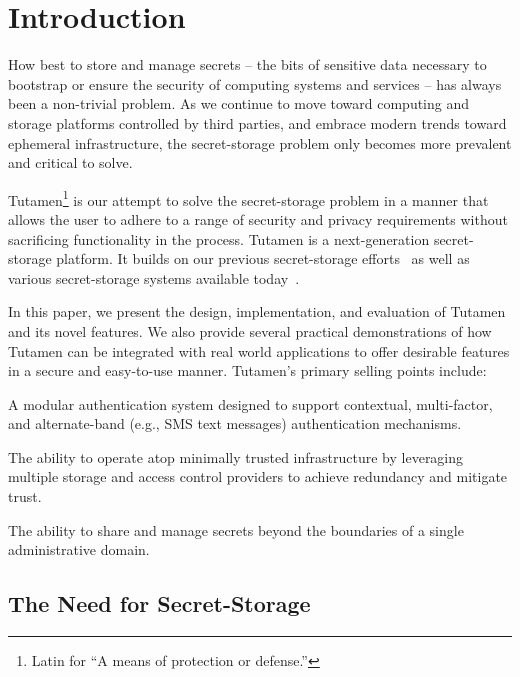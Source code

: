 \section{Introduction}
\label{sec:intro}

How best to store and manage secrets -- the bits of sensitive data
necessary to bootstrap or ensure the security of computing systems and
services -- has always been a non-trivial problem. As we continue to
move toward computing and storage platforms controlled by third
parties, and embrace modern trends toward ephemeral infrastructure,
the secret-storage problem only becomes more prevalent and critical to
solve.

Tutamen\footnote{Latin for ``A means of protection or defense.''} is
our attempt to solve the secret-storage problem in a manner that
allows the user to adhere to a range of security and privacy
requirements without sacrificing functionality in the process. Tutamen
is a next-generation secret-storage platform. It builds on our
previous secret-storage efforts~\cite{custos-trios} as well as various
secret-storage systems available today~\cite{vault, confidant,
  keywhiz}.

In this paper, we present the design, implementation, and evaluation
of Tutamen and its novel features. We also provide several practical
demonstrations of how Tutamen can be integrated with real world
applications to offer desirable features in a secure and easy-to-use
manner. Tutamen's primary selling points include:
\begin{packed_item}
\item A modular authentication system designed to support contextual,
  multi-factor, and alternate-band (e.g., SMS text messages)
  authentication mechanisms.
\item The ability to operate atop minimally trusted infrastructure by
  leveraging multiple storage and access control providers to achieve
  redundancy and mitigate trust.
\item The ability to share and manage secrets beyond the boundaries
  of a single administrative domain.
\end{packed_item}

\subsection{The Need for Secret-Storage}

